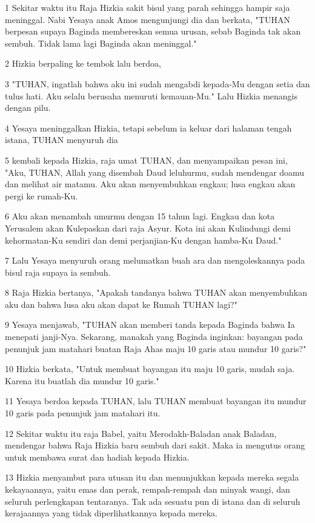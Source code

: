 \par 1 Sekitar waktu itu Raja Hizkia sakit bisul yang parah sehingga hampir saja meninggal. Nabi Yesaya anak Amos mengunjungi dia dan berkata, "TUHAN berpesan supaya Baginda membereskan semua urusan, sebab Baginda tak akan sembuh. Tidak lama lagi Baginda akan meninggal."
\par 2 Hizkia berpaling ke tembok lalu berdoa,
\par 3 "TUHAN, ingatlah bahwa aku ini sudah mengabdi kepada-Mu dengan setia dan tulus hati. Aku selalu berusaha menuruti kemauan-Mu." Lalu Hizkia menangis dengan pilu.
\par 4 Yesaya meninggalkan Hizkia, tetapi sebelum ia keluar dari halaman tengah istana, TUHAN menyuruh dia
\par 5 kembali kepada Hizkia, raja umat TUHAN, dan menyampaikan pesan ini, "Aku, TUHAN, Allah yang disembah Daud leluhurmu, sudah mendengar doamu dan melihat air matamu. Aku akan menyembuhkan engkau; lusa engkau akan pergi ke rumah-Ku.
\par 6 Aku akan menambah umurmu dengan 15 tahun lagi. Engkau dan kota Yerusalem akan Kulepaskan dari raja Asyur. Kota ini akan Kulindungi demi kehormatan-Ku sendiri dan demi perjanjian-Ku dengan hamba-Ku Daud."
\par 7 Lalu Yesaya menyuruh orang melumatkan buah ara dan mengoleskannya pada bisul raja supaya ia sembuh.
\par 8 Raja Hizkia bertanya, "Apakah tandanya bahwa TUHAN akan menyembuhkan aku dan bahwa lusa aku akan dapat ke Rumah TUHAN lagi?"
\par 9 Yesaya menjawab, "TUHAN akan memberi tanda kepada Baginda bahwa Ia menepati janji-Nya. Sekarang, manakah yang Baginda inginkan: bayangan pada penunjuk jam matahari buatan Raja Ahas maju 10 garis atau mundur 10 garis?"
\par 10 Hizkia berkata, "Untuk membuat bayangan itu maju 10 garis, mudah saja. Karena itu buatlah dia mundur 10 garis."
\par 11 Yesaya berdoa kepada TUHAN, lalu TUHAN membuat bayangan itu mundur 10 garis pada penunjuk jam matahari itu.
\par 12 Sekitar waktu itu raja Babel, yaitu Merodakh-Baladan anak Baladan, mendengar bahwa Raja Hizkia baru sembuh dari sakit. Maka ia mengutus orang untuk membawa surat dan hadiah kepada Hizkia.
\par 13 Hizkia menyambut para utusan itu dan menunjukkan kepada mereka segala kekayaannya, yaitu emas dan perak, rempah-rempah dan minyak wangi, dan seluruh perlengkapan tentaranya. Tak ada sesuatu pun di istana dan di seluruh kerajaannya yang tidak diperlihatkannya kepada mereka.
